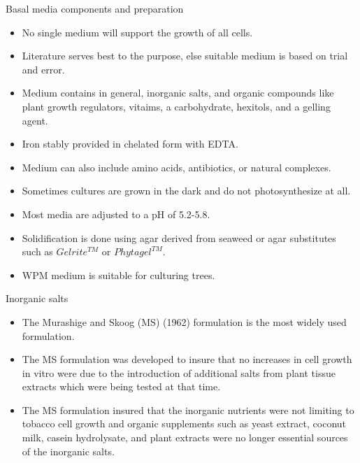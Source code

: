 \documentclass[
  ignorenonframetext,
  aspectratio=169]{beamer}
\providecommand{\tightlist}{%
  \setlength{\itemsep}{0pt}\setlength{\parskip}{0pt}}
\begin{document}
\begin{frame}{Basal media components and preparation}
\begin{itemize}
\tightlist
\item
  No single medium will support the growth of all cells.
\item
  Literature serves best to the purpose, else suitable medium is based
  on trial and error.
\item
  Medium contains in general, inorganic salts, and organic compounds
  like plant growth regulators, vitaims, a carbohydrate, hexitols, and a
  gelling agent.
\item
  Iron stably provided in chelated form with EDTA.
\item
  Medium can also include amino acids, antibiotics, or natural
  complexes.
\item
  Sometimes cultures are grown in the dark and do not photosynthesize at
  all.
\item
  Most media are adjusted to a pH of 5.2-5.8.
\item
  Solidification is done using agar derived from seaweed or agar
  substitutes such as \(Gelrite^{TM}\) or \(Phytagel^{TM}\).
\item
  WPM medium is suitable for culturing trees.
\end{itemize}
\end{frame}

\begin{frame}{Inorganic salts}
\protect\hypertarget{inorganic-salts}{}
\begin{itemize}
\tightlist
\item
  The Murashige and Skoog (MS) (1962) formulation is the most widely
  used formulation.
\item
  The MS formulation was developed to insure that no increases in cell
  growth in vitro were due to the introduction of additional salts from
  plant tissue extracts which were being tested at that time.
\item
  The MS formulation insured that the inorganic nutrients were not
  limiting to tobacco cell growth and organic supplements such as yeast
  extract, coconut milk, casein hydrolysate, and plant extracts were no
  longer essential sources of the inorganic salts.
\end{itemize}
\end{frame}
\end{document}
